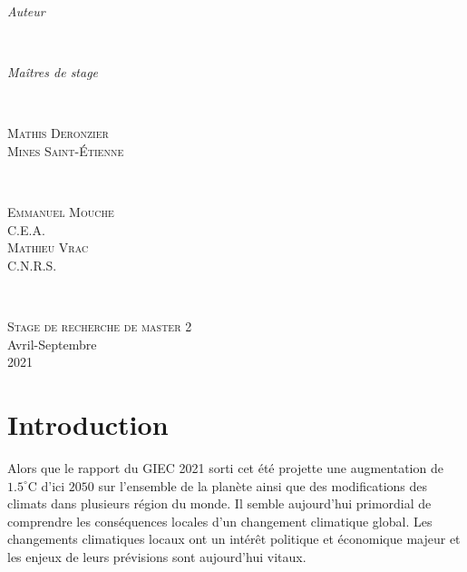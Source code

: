 \documentclass[a4paper,11pt]{article}
\begin{document}
	\begin{minipage}{0.4\textwidth}
		\begin{flushleft} \Large
			\emph{Auteur}\\
		\end{flushleft}
	\end{minipage}
	~
	\begin{minipage}{0.4\textwidth}
		\begin{flushright} \Large
			\emph{Maîtres de stage} \\
		\end{flushright}
	\end{minipage}\\[0.5 cm]
	\begin{minipage}{0.4\textwidth}
		\begin{flushleft} \large
			\textsc{Mathis Deronzier}\\
			\textsc{Mines Saint-Étienne}
		\end{flushleft}
	\end{minipage}
	~
	\begin{minipage}{0.4\textwidth}
		\begin{flushright} \large
			\textsc{Emmanuel Mouche}\\
			\textsc{C.E.A.}\\
			\textsc{Mathieu Vrac}\\
			\textsc{C.N.R.S.}
		\end{flushright}
	\end{minipage}\\[2cm]
	\begin{center}
		\textsc{\Large Stage de recherche de master 2}\\[0.5cm]  
		\large Avril-Septembre\\2021\\[2cm]
	\end{center}

\newpage
\tableofcontents
\newpage
\section{Introduction}

Alors que le rapport du GIEC 2021 sorti cet été projette une augmentation de $1.5^{\circ}$C d'ici $2050$ sur l'ensemble de la planète ainsi que des modifications des climats dans plusieurs région du monde. Il semble aujourd'hui primordial de comprendre les conséquences locales d'un changement climatique global. Les changements climatiques locaux ont un intérêt politique et économique majeur et les enjeux de leurs prévisions sont aujourd'hui vitaux.
\end{document}
